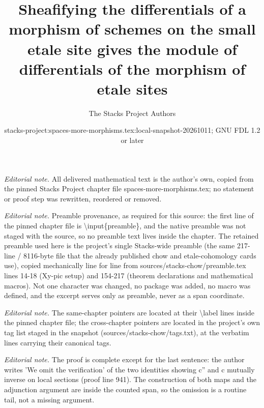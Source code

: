 \documentclass[10pt,a4paper]{amsart}
\title{Sheafifying the differentials of a morphism of schemes on the small etale site gives the module of differentials of the morphism of etale sites}
\author{The Stacks Project Authors}
\date{stacks-project:spaces-more-morphisms.tex:local-snapshot-20261011; GNU FDL 1.2 or later}
\theoremstyle{plain}
\theoremstyle{definition}
\theoremstyle{remark}
\numberwithin{equation}{subsection}
\begin{document}
\maketitle
\noindent\textit{Editorial note.} All delivered mathematical text is the author's own, copied from the pinned Stacks Project chapter file spaces-more-morphisms.tex; no statement or proof step was rewritten, reordered or removed.\par\medskip
\noindent\textit{Editorial note.} Preamble provenance, as required for this source: the first line of the pinned chapter file is \textbackslash{}input\{preamble\}, and the native preamble was not staged with the source, so no preamble text lives inside the chapter. The retained preamble used here is the project's single Stacks-wide preamble (the same 217-line / 8116-byte file that the already published chow and etale-cohomology cards use), copied mechanically line for line from sources/stacks-chow/preamble.tex lines 14-18 (Xy-pic setup) and 154-217 (theorem declarations and mathematical macros). Not one character was changed, no package was added, no macro was defined, and the excerpt serves only as preamble, never as a span coordinate.\par\medskip
\noindent\textit{Editorial note.} The same-chapter pointers are located at their \textbackslash{}label lines inside the pinned chapter file; the cross-chapter pointers are located in the project's own tag list staged in the snapshot (sources/stacks-chow/tags.txt), at the verbatim lines carrying their canonical tags.\par\medskip
\noindent\textit{Editorial note.} The proof is complete except for the last sentence: the author writes 'We omit the verification' of the two identities showing c'' and c mutually inverse on local sections (proof line 941). The construction of both maps and the adjunction argument are inside the counted span, so the omission is a routine tail, not a missing argument.\par\medskip
\end{document}
